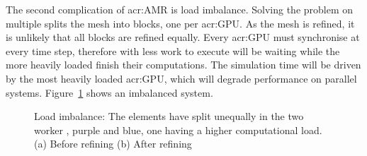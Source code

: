 The second complication of \acrshort{acr:AMR} is load imbalance. Solving the problem on multiple
 splits the mesh into blocks, one per \acrshort{acr:GPU}. As the mesh is
refined, it is unlikely that all blocks are refined equally. Every \acrshort{acr:GPU} must
synchronise at every time step, therefore  with less work to execute will be
waiting while the more heavily loaded  finish their computations. The simulation
time will be driven by the most heavily loaded \acrshort{acr:GPU}, which will degrade performance on
parallel systems. Figure~\ref{fig:intro_load_balancing} shows an imbalanced system.


\begin{figure}[H]
    \centering
    \hfill
    \caption{Load imbalance: The elements have split unequally in the two worker , purple and blue, one having a higher computational load. (a) Before refining (b) After refining}\label{fig:intro_load_balancing}
\end{figure}

